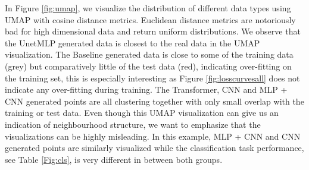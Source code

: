 






In Figure \ref{fig:umap}, we visualize the distribution of different data types using UMAP \citep{UMAP} with cosine distance metrics. Euclidean distance metrics are notoriously bad for high dimensional data and return uniform distributions.
We observe that the UnetMLP generated data is closest to the real data in the UMAP visualization. 
The Baseline generated data is close to some of the training data (grey) but comparatively little of the test data (red), indicating over-fitting on the training set, this is especially interesting as Figure \ref{fig:losscurvesall} does not indicate any over-fitting during training.
The Transformer, CNN and MLP + CNN generated points are all clustering together with only small overlap with the training or test data.
Even though this UMAP visualization can give us an indication of neighbourhood structure, we want to emphasize that the visualizations can be highly misleading. In this example, MLP + CNN and CNN generated points are similarly visualized while the classification task performance, see Table \ref{Fig:cls}, is very different in between both groups. 



